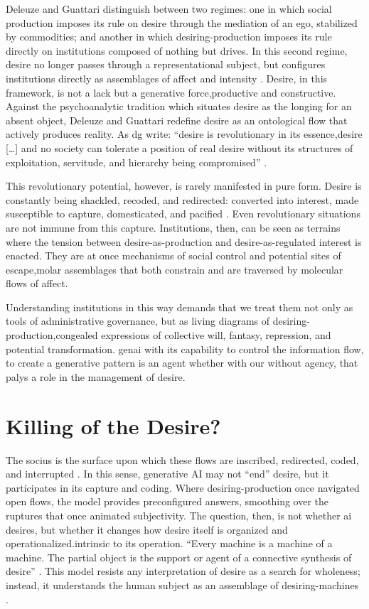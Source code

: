 Deleuze and Guattari distinguish between two regimes: one in which social production imposes its rule on desire through the mediation of an ego, stabilized by commodities; and another in which desiring-production imposes its rule directly on institutions composed of nothing but drives. In this second regime, desire no longer passes through a representational subject, but configures institutions directly as assemblages of affect and intensity \parencite[63]{deleuze1983}. Desire, in this framework, is not a lack but a generative force,productive and constructive. Against the psychoanalytic tradition which situates desire as the longing for an absent object, Deleuze and Guattari redefine desire as an ontological flow that actively produces reality. As \gls{dg} write: ``desire is revolutionary in its essence,desire [\ldots] and no society can tolerate a position of real desire without its structures of exploitation, servitude, and hierarchy being compromised'' \parencite[116]{deleuze1983}.

This revolutionary potential, however, is rarely manifested in pure form. Desire is constantly being shackled, recoded, and redirected: converted into interest, made susceptible to capture, domesticated, and pacified \parencite[11]{buchanan2008b}. Even revolutionary situations are not immune from this capture. Institutions, then, can be seen as terrains where the tension between desire-as-production and desire-as-regulated interest is enacted. They are at once mechanisms of social control and potential sites of escape,molar assemblages that both constrain and are traversed by molecular flows of affect.

Understanding institutions in this way demands that we treat them not only as tools of administrative governance, but as living diagrams of desiring-production,congealed expressions of collective will, fantasy, repression, and potential transformation. \Gls{genai} with its capability to control the information flow, to create a generative pattern is an agent whether with our without agency, that palys a role in the management of desire.



\section{Killing of the Desire?}

The socius is the surface upon which these flows are inscribed, redirected, coded, and interrupted \parencite[11–13]{deleuze1983}. In this sense, generative AI may not “end” desire, but it participates in its capture and coding. Where desiring-production once navigated open flows, the model provides preconfigured answers, smoothing over the ruptures that once animated subjectivity. The question, then, is not whether \gls{ai} desires, but whether it changes how desire itself is organized and operationalized.intrinsic to its operation. “Every machine is a machine of a machine. The partial object is the support or agent of a connective synthesis of desire” \parencite[6]{deleuze1983}. This model resists any interpretation of desire as a search for wholeness; instead, it understands the human subject as an assemblage of desiring-machines \parencite[10]{deleuze1983}.

